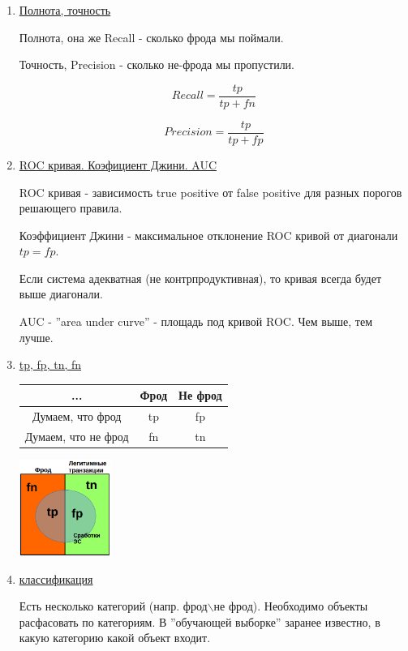 \documentclass{proc}
\begin{document}
\begin{enumerate}
\item \underline{Полнота, точность}

Полнота, она же Recall - сколько фрода мы поймали.

Точность, Precision - сколько не-фрода мы пропустили.

$$Recall = \frac{tp}{tp+fn}$$

$$Precision = \frac{tp}{tp+fp}$$

\item \underline{ROC кривая. Коэфициент Джини.  AUC}

ROC кривая - зависимость true positive от false positive для разных порогов решающего правила.

Коэффициент Джини - максимальное отклонение ROC кривой от диагонали $tp = fp$.

Если система адекватная (не контрпродуктивная), то кривая всегда будет выше диагонали.

AUC - ''area under curve'' - площадь под кривой ROC. Чем выше, тем лучше.

\item \underline{tp, fp, tn, fn}

\begin{center}
    \begin{tabular}{| c | c | c |}
    \hline
    ... & Фрод & Не фрод \\ \hline
    Думаем, что фрод & tp & fp \\ \hline
    Думаем, что не фрод & fn & tn \\ \hline
    \end{tabular}

\includegraphics[width=3cm]{tptnfpfn}
\end{center}


\item \underline{классификация}

Есть несколько категорий (напр. фрод$\backslash$не фрод). Необходимо объекты расфасовать по категориям. В ''обучающей выборке'' заранее известно, в какую категорию какой объект входит. 


\end{enumerate}
\end{document}

